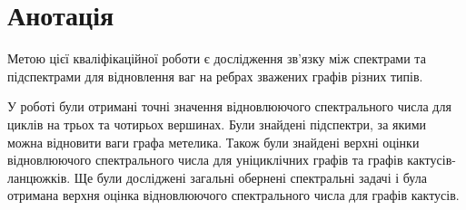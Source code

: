 \setcounter{secnumdepth}{-2}
\section{Анотація}

Метою цієї кваліфікаційної роботи є дослідження зв'язку між спектрами та підспектрами для відновлення ваг на ребрах зважених графів різних типів.

У роботі були отримані точні значення відновлюючого спектрального числа для циклів на трьох та чотирьох вершинах. Були знайдені підспектри, за якими можна відновити ваги графа метелика. Також були знайдені верхні оцінки відновлюючого спектрального числа для уніциклічних графів та графів кактусів-ланцюжків. Ще були досліджені загальні обернені спектральні задачі і була отримана верхня оцінка відновлюючого спектрального числа для графів кактусів.
